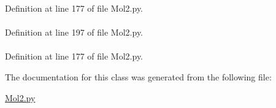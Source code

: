 \-Definition at line 177 of file \-Mol2.\-py.

\hypertarget{classforcebalance_1_1Mol2_1_1mol2__bond_a2fc8dbc0491b8295c8f7cb666f39b5a5}{
\paragraph[{status\-\_\-bit}]{}}\label{classforcebalance_1_1Mol2_1_1mol2__bond_a2fc8dbc0491b8295c8f7cb666f39b5a5}


\-Definition at line 197 of file \-Mol2.\-py.

\hypertarget{classforcebalance_1_1Mol2_1_1mol2__bond_ae65675970bd6b63a9f3c76f23ac5ebfb}{
\paragraph[{target\-\_\-atom\-\_\-id}]{}}\label{classforcebalance_1_1Mol2_1_1mol2__bond_ae65675970bd6b63a9f3c76f23ac5ebfb}


\-Definition at line 177 of file \-Mol2.\-py.



\-The documentation for this class was generated from the following file\-:\begin{DoxyCompactItemize}
\item 
\hyperlink{Mol2_8py}{\-Mol2.\-py}\end{DoxyCompactItemize}
